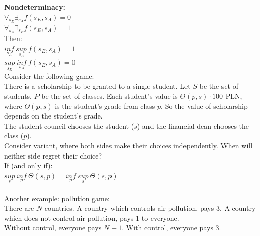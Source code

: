\noindent
\textbf{Nondeterminacy:}\\
$\forall_{s_E} \exists_{s_A} f(s_E, s_A) = 0$\\
$\forall_{s_A} \exists_{s_E} f(s_E, s_A) = 1$\\
Then:\\
$\underset{s_A}{inf}\ \underset{s_E}{sup}\ f(s_E, s_A) = 1$\\
$\underset{s_E}{sup}\ \underset{s_A}{inf}\ f(s_E, s_A) = 0$\\

\noindent
Consider the following game:\\
There is a scholarship to be granted to a single student. Let $S$ be the set of students, $P$ be the set of classes.
Each student's value is $\Theta(p, s) \cdot 100$ PLN, where $\Theta(p, s)$ is the student's grade from class $p$.
So the value of scholarship depends on the student's grade.\\
The student council chooses the student ($s$) and the financial dean chooses the class ($p$).\\
Consider variant, where both sides make their choices independently. When will neither side regret their choice?\\

\noindent
If (and only if):\\
$\underset{s}{sup}\ \underset{p}{inf}\ \Theta(s, p) = \underset{p}{inf}\ \underset{s}{sup}\ \Theta(s, p)$\\\\

\noindent
Another example: pollution game:\\
There are $N$ countries. A country which controls air pollution, pays $3$. A country which does not control air pollution,
pays $1$ to everyone.\\
Without control, everyone pays $N-1$. With control, everyone pays $3$.

